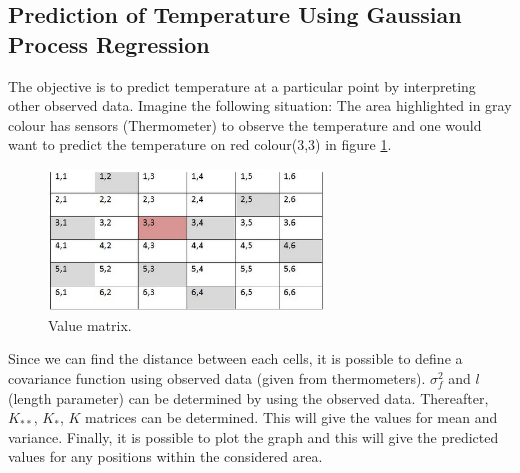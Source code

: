 \subsection{Prediction of  Temperature Using Gaussian Process Regression}
The objective is to predict temperature at a particular point by interpreting other observed data. Imagine the following situation: The area highlighted in gray colour has sensors (Thermometer) to observe the temperature and one would want  to predict the temperature on red colour(3,3) in figure \ref{fig:value-matrix}.
\begin{figure}[here]
  \centering
      \includegraphics[width=0.65\textwidth]{theory/graphics/value-matrix.png}
  \caption{ Value matrix. }
  \label{fig:value-matrix}
\end{figure}
Since we can find the distance between each cells, it is possible to define a covariance function using observed data (given from thermometers). $ \sigma_{f}^{2} $ and $ l $ (length parameter) can be determined by using the observed data. Thereafter, $ K_{**} $, $ K_{*} $, $ K $ matrices can be determined. This will give the values for mean and variance. Finally, it is possible to plot the graph and this will give the predicted values for any positions within the considered area.
